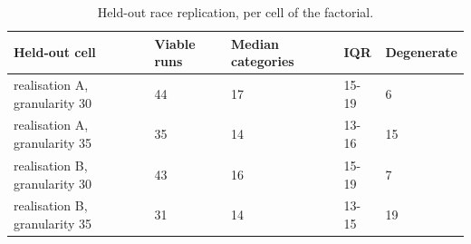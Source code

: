 \begin{table}[H]
\centering\rmfamily\footnotesize
\caption{Held-out race replication, per cell of the factorial.}
\label{tab:supp-heldout}
\begin{tabular}{lllll}
\toprule
Held-out cell & Viable runs & Median categories & IQR & Degenerate \\
\midrule
realisation A, granularity 30 & 44 & 17 & 15-19 & 6 \\
realisation A, granularity 35 & 35 & 14 & 13-16 & 15 \\
realisation B, granularity 30 & 43 & 16 & 15-19 & 7 \\
realisation B, granularity 35 & 31 & 14 & 13-15 & 19 \\
\bottomrule
\end{tabular}
\end{table}

